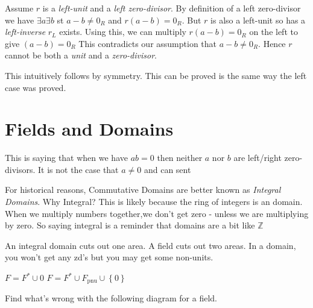 
Assume $r$ is a \textit{left-unit} and a \textit{left zero-divisor}.
By definition of a left zero-divisor we have $\exists a \exists b$ st $a-b \neq 0_R$ and $r(a-b) = 0_R$. 
But $r$ is also a left-unit so has a \textit{left-inverse} $r_L$ exists. 
Using this, we can multiply $r(a-b) = 0_R$ on the left to give $(a-b) = 0_R$
This contradicts our assumption that $a-b \neq 0_R$. 
Hence $r$ cannot be both a \textit{unit} and a \textit{zero-divisor}.


This intuitively follows by symmetry. This can be proved is the same way the left case was proved.









\section{Fields and Domains}



This is saying that when we have $ab = 0$ then neither $a$ nor $b$ are left/right zero-divisors.
It is not the case that $a \neq 0$ and can sent


For historical reasons, Commutative Domains are better known as \textit{Integral Domains}. 
Why Integral? This is likely because the ring of integers is an domain. 
When we multiply numbers together,we don't get zero - unless we are multiplying by zero. 
So saying integral is a reminder that domains are a bit like $\mathbb{Z}$





An integral domain cuts out one area. A field cuts out two areas.
In a domain, you won't get any zd's but you may get some non-units.

$F = F^{*} \cup {0}$
$F = F^{*} \cup F_{\text{pnu}} \cup  \left\{0\right\}$


\begin{example}
Find what's wrong with the following diagram for a field.
\end{example}



